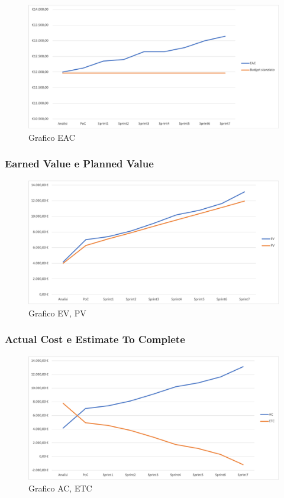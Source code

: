 \begin{figure}[H]
\centering
\includegraphics[width=1\textwidth]{src/img/EAC.png}
\caption{Grafico EAC}
\end{figure}

\subsubsection{Earned Value e Planned Value}

\begin{figure}[H]
\centering
\includegraphics[width=1\textwidth]{src/img/EVPV.png}
\caption{Grafico EV, PV}
\end{figure}

\subsubsection{Actual Cost e Estimate To Complete}
\begin{figure}[H]
\centering
\includegraphics[width=1\textwidth]{src/img/ACETC.png}
\caption{Grafico AC, ETC}
\end{figure}

